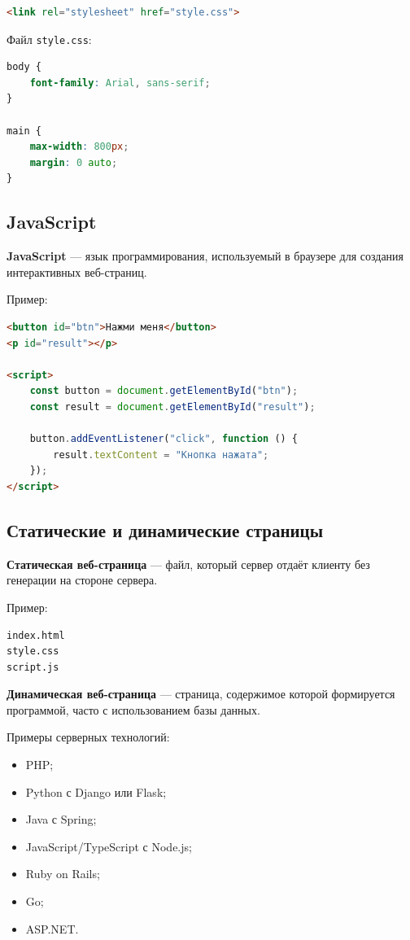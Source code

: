 \documentclass[12pt,a4paper]{article}
\begin{document}
\begin{lstlisting}[language=HTML]
<link rel="stylesheet" href="style.css">
\end{lstlisting}

Файл \texttt{style.css}:
\begin{lstlisting}[language=CSS]
body {
    font-family: Arial, sans-serif;
}

main {
    max-width: 800px;
    margin: 0 auto;
}
\end{lstlisting}

\subsection{JavaScript}

\textbf{JavaScript} --- язык программирования, используемый в браузере для создания интерактивных веб-страниц.

Пример:
\begin{lstlisting}[language=HTML]
<button id="btn">Нажми меня</button>
<p id="result"></p>

<script>
    const button = document.getElementById("btn");
    const result = document.getElementById("result");

    button.addEventListener("click", function () {
        result.textContent = "Кнопка нажата";
    });
</script>
\end{lstlisting}

\subsection{Статические и динамические страницы}

\textbf{Статическая веб-страница} --- файл, который сервер отдаёт клиенту без генерации на стороне сервера.

Пример:
\begin{lstlisting}
index.html
style.css
script.js
\end{lstlisting}

\textbf{Динамическая веб-страница} --- страница, содержимое которой формируется программой, часто с использованием базы данных.

Примеры серверных технологий:
\begin{itemize}
    \item PHP;
    \item Python с Django или Flask;
    \item Java с Spring;
    \item JavaScript/TypeScript с Node.js;
    \item Ruby on Rails;
    \item Go;
    \item ASP.NET.
\end{itemize}
\end{document}
